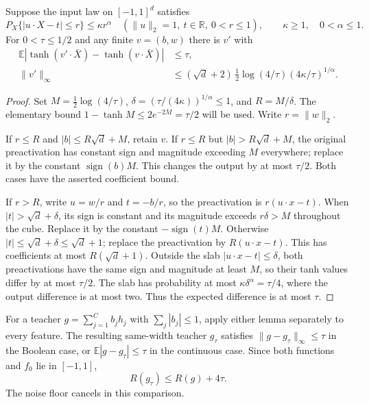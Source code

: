 \begin{lemma}
\label{lem:l1-continuous-ridge}
Suppose the input law on $[-1,1]^d$ satisfies
\[
 P_X\{|u\cdot X-t|\le r\}\le\kappa r^\alpha
 \quad(\|u\|_2=1,\ t\in\mathbb R,\ 0<r\le1),
 \qquad \kappa\ge1,\quad0<\alpha\le1.
\]
For $0<\tau\le1/2$ and any finite $v=(b,w)$ there is $v'$ with
\begin{align*}
 \mathbb E|\tanh(v'\cdot\bar X)-\tanh(v\cdot\bar X)|&\le\tau,\\
 \|v'\|_\infty&\le
 (\sqrt d+2)\,\tfrac12\log(4/\tau)
                     (4\kappa/\tau)^{1/\alpha}.
\end{align*}
\end{lemma}
\begin{proof}
Set $M=\frac12\log(4/\tau)$,
$\delta=(\tau/(4\kappa))^{1/\alpha}\le1$, and $R=M/\delta$.
The elementary bound $1-\tanh M\le2e^{-2M}=\tau/2$ will be used.
Write $r=\|w\|_2$.

If $r\le R$ and $|b|\le R\sqrt d+M$, retain $v$. If $r\le R$ but
$|b|>R\sqrt d+M$, the original preactivation has constant sign and
magnitude exceeding $M$ everywhere; replace it by the constant
$\operatorname{sign}(b)M$. This changes the output by at most $\tau/2$.
Both cases have the asserted coefficient bound.

If $r>R$, write $u=w/r$ and $t=-b/r$, so the preactivation is
$r(u\cdot x-t)$. When $|t|>\sqrt d+\delta$, its sign is constant and
its magnitude exceeds $r\delta>M$ throughout the cube. Replace it
by the constant $-\operatorname{sign}(t)M$. Otherwise
$|t|\le\sqrt d+\delta\le\sqrt d+1$; replace the preactivation by
$R(u\cdot x-t)$. This has coefficients at most $R(\sqrt d+1)$.
Outside the slab $|u\cdot x-t|\le\delta$, both preactivations have
the same sign and magnitude at least $M$, so their tanh values differ
by at most $\tau/2$. The slab has probability at most
$\kappa\delta^\alpha=\tau/4$, where the output difference is at most
two. Thus the expected difference is at most $\tau$.
\end{proof}

For a teacher $g=\sum_{j=1}^C b_jh_j$ with $\sum_j|b_j|\le1$, apply
either lemma separately to every feature. The resulting same-width
teacher $g_\tau$ satisfies $\|g-g_\tau\|_\infty\le\tau$ in the Boolean
case, or $\mathbb E|g-g_\tau|\le\tau$ in the continuous case. Since both
functions and $f_0$ lie in $[-1,1]$,
\[
 R(g_\tau)\le R(g)+4\tau.
\]
The noise floor cancels in this comparison.

